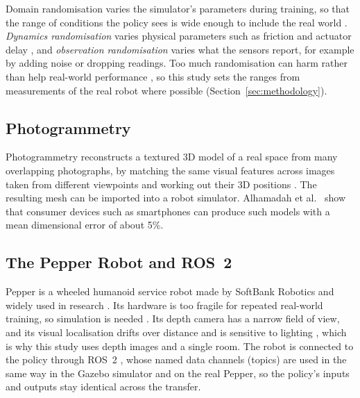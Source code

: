 Domain randomisation varies the simulator's parameters during training, so that the range of
conditions the policy sees is wide enough to include the real world \cite{tobin2017domain}.
\emph{Dynamics randomisation} varies physical parameters such as friction and actuator delay
\cite{peng2018dynamics}, and \emph{observation randomisation} varies what the sensors report,
for example by adding noise or dropping readings. Too much randomisation can harm rather than
help real-world performance \cite{zhao2020sim}, so this study sets the ranges from measurements
of the real robot where possible (Section~\ref{sec:methodology}).

\subsection{Photogrammetry}
Photogrammetry reconstructs a textured 3D model of a real space from many overlapping
photographs, by matching the same visual features across images taken from different viewpoints
and working out their 3D positions \cite{alhamadah2024photogrammetry}. The resulting mesh can be
imported into a robot simulator. Alhamadah et al.\ \cite{alhamadah2024photogrammetry} show that
consumer devices such as smartphones can produce such models with a mean dimensional error of
about 5\%.

\subsection{The Pepper Robot and ROS~2}
Pepper is a wheeled humanoid service robot made by SoftBank Robotics and widely used in research
\cite{pandey2018pepper, sekkat2024pepper}. Its hardware is too fragile for repeated real-world
training, so simulation is needed \cite{sekkat2024pepper}. Its depth camera has a narrow field
of view, and its visual localisation drifts over distance and is sensitive to lighting
\cite{gomez2018visual}, which is why this study uses depth images and a single room. The robot is
connected to the policy through ROS~2 \cite{macenski2022ros2}, whose named data channels
(topics) are used in the same way in the Gazebo simulator \cite{koenig2004gazebo} and on the real
Pepper, so the policy's inputs and outputs stay identical across the transfer.
